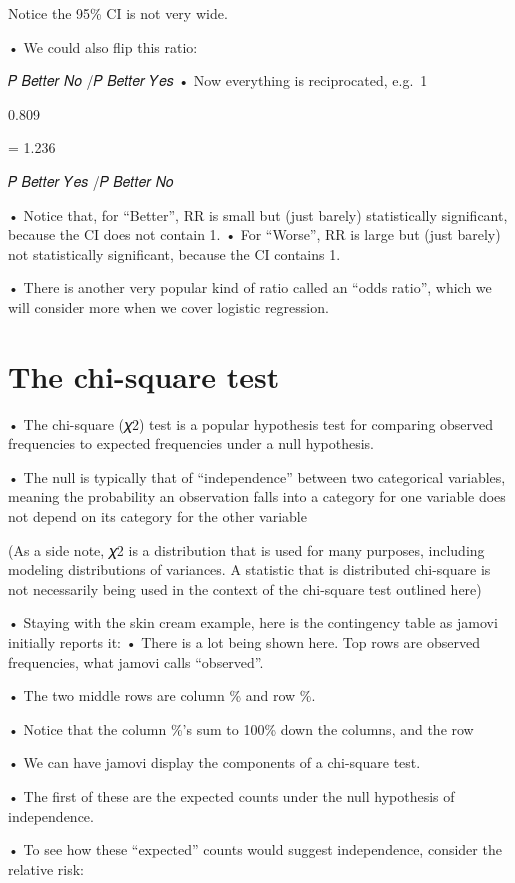 \documentclass[
  letterpaper,
  DIV=11,
  numbers=noendperiod]{scrreprt}
\begin{document}
Notice the 95\% CI is not very wide.

• We could also flip this ratio:

𝑃 𝐵𝑒𝑡𝑡𝑒𝑟 𝑁𝑜 /𝑃 𝐵𝑒𝑡𝑡𝑒𝑟 𝑌𝑒𝑠 • Now everything is reciprocated, e.g.~1

0.809

= 1.236

𝑃 𝐵𝑒𝑡𝑡𝑒𝑟 𝑌𝑒𝑠 /𝑃 𝐵𝑒𝑡𝑡𝑒𝑟 𝑁𝑜

• Notice that, for ``Better'', RR is small but (just barely)
statistically significant, because the CI does not contain 1. • For
``Worse'', RR is large but (just barely) not statistically significant,
because the CI contains 1.

• There is another very popular kind of ratio called an ``odds ratio'',
which we will consider more when we cover logistic regression.

\hypertarget{the-chi-square-test}{%
\section{The chi-square test}\label{the-chi-square-test}}

• The chi-square (𝜒2) test is a popular hypothesis test for comparing
observed frequencies to expected frequencies under a null hypothesis.

• The null is typically that of ``independence'' between two categorical
variables, meaning the probability an observation falls into a category
for one variable does not depend on its category for the other variable

(As a side note, 𝜒2 is a distribution that is used for many purposes,
including modeling distributions of variances. A statistic that is
distributed chi-square is not necessarily being used in the context of
the chi-square test outlined here)

• Staying with the skin cream example, here is the contingency table as
jamovi initially reports it: • There is a lot being shown here. Top rows
are observed frequencies, what jamovi calls ``observed''.

• The two middle rows are column \% and row \%.

• Notice that the column \%'s sum to 100\% down the columns, and the row

• We can have jamovi display the components of a chi-square test.

• The first of these are the expected counts under the null hypothesis
of independence.

• To see how these ``expected'' counts would suggest independence,
consider the relative risk:
\end{document}
